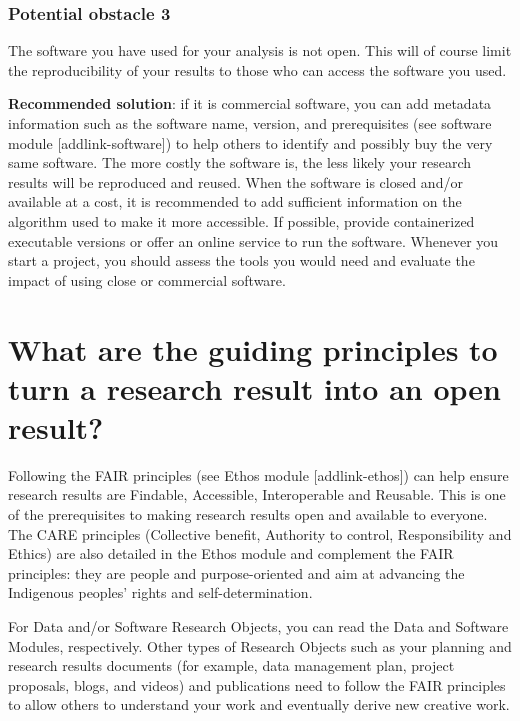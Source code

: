 \documentclass[
  letterpaper,
  DIV=11,
  numbers=noendperiod]{scrreport}
\begin{document}
\hypertarget{potential-obstacle-3}{%
\subsubsection{Potential obstacle 3}\label{potential-obstacle-3}}

The software you have used for your analysis is not open. This will of
course limit the reproducibility of your results to those who can access
the software you used.

\textbf{Recommended solution}: if it is commercial software, you can add
metadata information such as the software name, version, and
prerequisites (see software module {[}addlink-software{]}) to help
others to identify and possibly buy the very same software. The more
costly the software is, the less likely your research results will be
reproduced and reused. When the software is closed and/or available at a
cost, it is recommended to add sufficient information on the algorithm
used to make it more accessible. If possible, provide containerized
executable versions or offer an online service to run the software.
Whenever you start a project, you should assess the tools you would need
and evaluate the impact of using close or commercial software.

\hypertarget{what-are-the-guiding-principles-to-turn-a-research-result-into-an-open-result}{%
\section{What are the guiding principles to turn a research result into
an open
result?}\label{what-are-the-guiding-principles-to-turn-a-research-result-into-an-open-result}}

Following the FAIR principles (see Ethos module {[}addlink-ethos{]}) can
help ensure research results are Findable, Accessible, Interoperable and
Reusable. This is one of the prerequisites to making research results
open and available to everyone. The CARE principles (Collective benefit,
Authority to control, Responsibility and Ethics) are also detailed in
the Ethos module and complement the FAIR principles: they are people and
purpose-oriented and aim at advancing the Indigenous peoples' rights and
self-determination.

For Data and/or Software Research Objects, you can read the Data and
Software Modules, respectively. Other types of Research Objects such as
your planning and research results documents (for example, data
management plan, project proposals, blogs, and videos) and publications
need to follow the FAIR principles to allow others to understand your
work and eventually derive new creative work.
\end{document}
